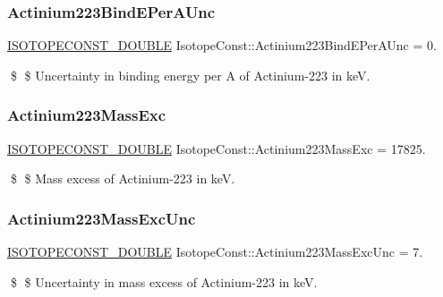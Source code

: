 \subsubsection{\texorpdfstring{Actinium223\+Bind\+E\+Per\+A\+Unc}{Actinium223BindEPerAUnc}}
{\footnotesize\ttfamily \mbox{\hyperlink{group___isotope_const-_macros_ga8f45a7272ce02c0b4c65c44636ed719a}{I\+S\+O\+T\+O\+P\+E\+C\+O\+N\+S\+T\+\_\+\+D\+O\+U\+B\+LE}} Isotope\+Const\+::\+Actinium223\+Bind\+E\+Per\+A\+Unc = 0.}

\$ \$ Uncertainty in binding energy per A of Actinium-\/223 in keV. \mbox{\label{group___isotope_const-_actinium-_ac223_gac3b2fa2903b63a42db4fc6557bb0b949}} 
\subsubsection{\texorpdfstring{Actinium223\+Mass\+Exc}{Actinium223MassExc}}
{\footnotesize\ttfamily \mbox{\hyperlink{group___isotope_const-_macros_ga8f45a7272ce02c0b4c65c44636ed719a}{I\+S\+O\+T\+O\+P\+E\+C\+O\+N\+S\+T\+\_\+\+D\+O\+U\+B\+LE}} Isotope\+Const\+::\+Actinium223\+Mass\+Exc = 17825.}

\$ \$ Mass excess of Actinium-\/223 in keV. \mbox{\label{group___isotope_const-_actinium-_ac223_ga3d2d4743d5c938576c0a7bb7bd2011c1}} 
\subsubsection{\texorpdfstring{Actinium223\+Mass\+Exc\+Unc}{Actinium223MassExcUnc}}
{\footnotesize\ttfamily \mbox{\hyperlink{group___isotope_const-_macros_ga8f45a7272ce02c0b4c65c44636ed719a}{I\+S\+O\+T\+O\+P\+E\+C\+O\+N\+S\+T\+\_\+\+D\+O\+U\+B\+LE}} Isotope\+Const\+::\+Actinium223\+Mass\+Exc\+Unc = 7.}

\$ \$ Uncertainty in mass excess of Actinium-\/223 in keV. \mbox{\label{group___isotope_const-_actinium-_ac223_ga343927a46667f01b015197754ee1f144}} 
